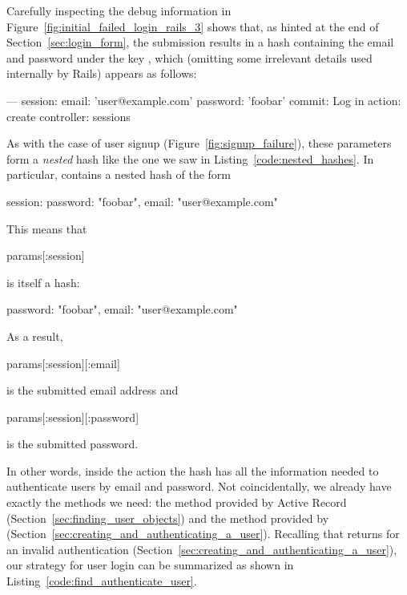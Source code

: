 Carefully inspecting the debug information in Figure~\ref{fig:initial_failed_login_rails_3} shows that, as hinted at the end of Section~\ref{sec:login_form}, the submission results in a  hash containing the email and password under the key , which (omitting some irrelevant details used internally by Rails) appears as follows:

\begin{code}
---
session:
  email: 'user@example.com'
  password: 'foobar'
commit: Log in
action: create
controller: sessions
\end{code}

\noindent As with the case of user signup (Figure~\ref{fig:signup_failure}), these parameters form a \emph{nested} hash like the one we saw in Listing~\ref{code:nested_hashes}. In particular,  contains a nested hash of the form

\begin{code}
{ session: { password: "foobar", email: "user@example.com" } }
\end{code}

\noindent This means that

\begin{code}
params[:session]
\end{code}

\noindent is itself a hash:

\begin{code}
{ password: "foobar", email: "user@example.com" }
\end{code}

\noindent As a result,

\begin{code}
params[:session][:email]
\end{code}

\noindent is the submitted email address and

\begin{code}
params[:session][:password]
\end{code}

\noindent is the submitted password.

In other words, inside the  action the  hash has all the information needed to authenticate users by email and password. Not coincidentally, we already have exactly the methods we need: the  method provided by Active Record (Section~\ref{sec:finding_user_objects}) and the  method provided by  (Section~\ref{sec:creating_and_authenticating_a_user}). Recalling that  returns  for an invalid authentication (Section~\ref{sec:creating_and_authenticating_a_user}), our strategy for user login can be summarized as shown in Listing~\ref{code:find_authenticate_user}.


